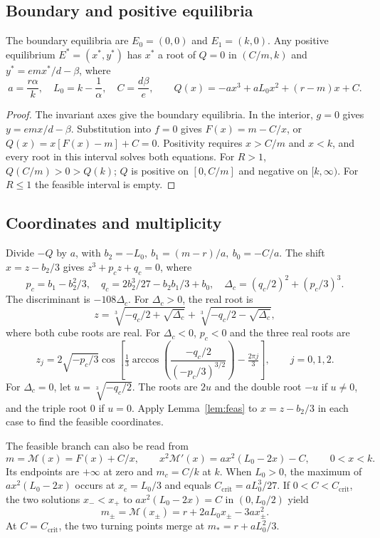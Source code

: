\subsection{Boundary and positive equilibria}
\begin{lemma}[Feasibility]\label{lem:feas}
The boundary equilibria are \(E_0=(0,0)\) and \(E_1=(k,0)\). Any positive equilibrium \(E^*=(x^*,y^*)\) has \(x^*\) a root of \(Q=0\) in \((C/m,k)\) and \(y^*=emx^*/d-\beta\), where
\begin{equation}\label{eq:Q}
 a=\frac{r\alpha}{k},\quad
 L_0=k-\frac{1}{\alpha},\quad
 C=\frac{d\beta}{e},\qquad
 Q(x)=-ax^3+aL_0x^2+(r-m)x+C.
\end{equation}
\end{lemma}
\begin{proof}
The invariant axes give the boundary equilibria. In the interior, \(g=0\) gives \(y=emx/d-\beta\). Substitution into \(f=0\) gives \(F(x)=m-C/x\), or \(Q(x)=x[F(x)-m]+C=0\). Positivity requires \(x>C/m\) and \(x<k\), and every root in this interval solves both equations. For \(R>1\), \(Q(C/m)>0>Q(k)\); \(Q\) is positive on \([0,C/m]\) and negative on \([k,\infty)\). For \(R\le1\) the feasible interval is empty.
\end{proof}

\subsection{Coordinates and multiplicity}
Divide \(-Q\) by \(a\), with \(b_2=-L_0,\ b_1=(m-r)/a,\ b_0=-C/a\). The shift \(x=z-b_2/3\) gives \(z^3+p_c z+q_c=0\), where
\[
 p_c=b_1-b_2^2/3,\quad q_c=2b_2^3/27-b_2b_1/3+b_0,\quad
 \Delta_c=(q_c/2)^2+(p_c/3)^3.
\]
The discriminant is \(-108\Delta_c\). For \(\Delta_c>0\), the real root is
\[
 z=\sqrt[3]{-q_c/2+\sqrt{\Delta_c}}+\sqrt[3]{-q_c/2-\sqrt{\Delta_c}},
\]
where both cube roots are real. For \(\Delta_c<0\), \(p_c<0\) and the three real roots are
\[
 z_j=2\sqrt{-p_c/3}\cos\!\left[
 \tfrac13\arccos\!\left(\frac{-q_c/2}{(-p_c/3)^{3/2}}\right)-\tfrac{2\pi j}{3}
 \right],\qquad j=0,1,2.
\]
For \(\Delta_c=0\), let \(u=\sqrt[3]{-q_c/2}\). The roots are \(2u\) and the double root \(-u\) if \(u\ne0\), and the triple root \(0\) if \(u=0\). Apply Lemma~\ref{lem:feas} to \(x=z-b_2/3\) in each case to find the feasible coordinates.

The feasible branch can also be read from
\[
 m=\mathcal M(x)=F(x)+C/x,\qquad
 x^2\mathcal M'(x)=a x^2(L_0-2x)-C,\qquad 0<x<k.
\]
Its endpoints are \(+\infty\) at zero and \(m_c=C/k\) at \(k\). When \(L_0>0\), the maximum of \(a x^2(L_0-2x)\) occurs at \(x_c=L_0/3\) and equals \(C_{\mathrm{crit}}=aL_0^3/27\). If \(0<C<C_{\mathrm{crit}}\), the two solutions \(x_-<x_+\) to \(a x^2(L_0-2x)=C\) in \((0,L_0/2)\) yield
\[
 m_\pm=\mathcal M(x_\pm)=r+2aL_0x_\pm-3ax_\pm^2.
\]
At \(C=C_{\mathrm{crit}}\), the two turning points merge at \(m_*=r+aL_0^2/3\).

